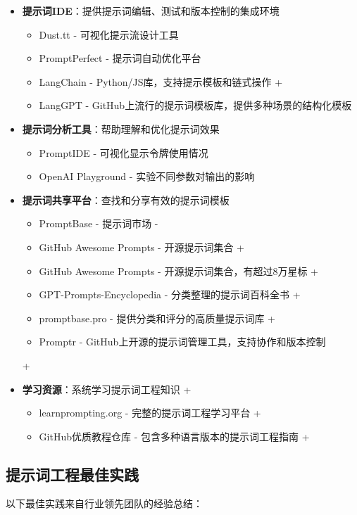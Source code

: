 \documentclass[12pt]{ctexart}
\begin{document}
\begin{itemize}
  \item \textbf{提示词IDE}：提供提示词编辑、测试和版本控制的集成环境
    \begin{itemize}
      \item Dust.tt - 可视化提示流设计工具
      \item PromptPerfect - 提示词自动优化平台
      \item LangChain - Python/JS库，支持提示模板和链式操作
+     \item LangGPT - GitHub上流行的提示词模板库，提供多种场景的结构化模板
    \end{itemize}
  \item \textbf{提示词分析工具}：帮助理解和优化提示词效果
    \begin{itemize}
      \item PromptIDE - 可视化显示令牌使用情况
      \item OpenAI Playground - 实验不同参数对输出的影响
    \end{itemize}
  \item \textbf{提示词共享平台}：查找和分享有效的提示词模板
    \begin{itemize}
      \item PromptBase - 提示词市场
-     \item GitHub Awesome Prompts - 开源提示词集合
+     \item GitHub Awesome Prompts - 开源提示词集合，有超过8万星标
+     \item GPT-Prompts-Encyclopedia - 分类整理的提示词百科全书
+     \item promptbase.pro - 提供分类和评分的高质量提示词库
+     \item Promptr - GitHub上开源的提示词管理工具，支持协作和版本控制
    \end{itemize}
+  \item \textbf{学习资源}：系统学习提示词工程知识
+    \begin{itemize}
+      \item learnprompting.org - 完整的提示词工程学习平台
+      \item GitHub优质教程仓库 - 包含多种语言版本的提示词工程指南
+    \end{itemize}
\end{itemize}

\subsection{提示词工程最佳实践}
以下最佳实践来自行业领先团队的经验总结：
\end{document}
